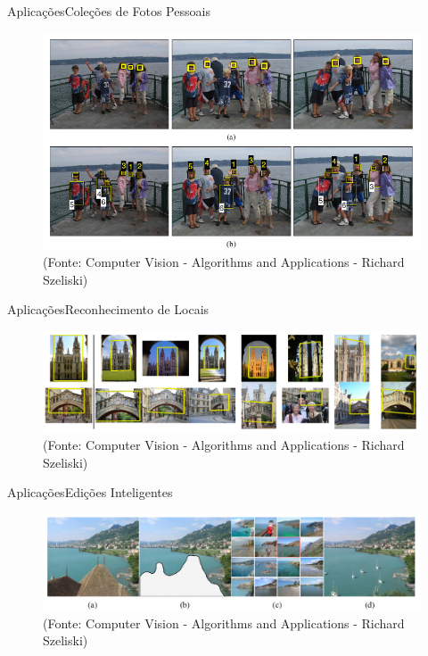 \begin{frame}{Aplicações}{Coleções de Fotos Pessoais}

\begin{figure}
    \centering
    \includegraphics[scale=.3]{img/personal_collection.png}
    \caption{(Fonte: Computer Vision - Algorithms and Applications - Richard Szeliski)}
    \label{fig:personal_collection}
\end{figure}

\end{frame}

\begin{frame}{Aplicações}{Reconhecimento de Locais}

\begin{figure}
    \centering
    \includegraphics[scale=.3]{img/location_recognition.png}
    \caption{(Fonte: Computer Vision - Algorithms and Applications - Richard Szeliski)}
    \label{fig:location_recognition}
\end{figure}

\end{frame}

\begin{frame}{Aplicações}{Edições Inteligentes}

\begin{figure}
    \centering
    \includegraphics[scale=.28]{img/smart_editing.png}
    \caption{(Fonte: Computer Vision - Algorithms and Applications - Richard Szeliski)}
    \label{fig:smart_editing}
\end{figure}

\end{frame}

